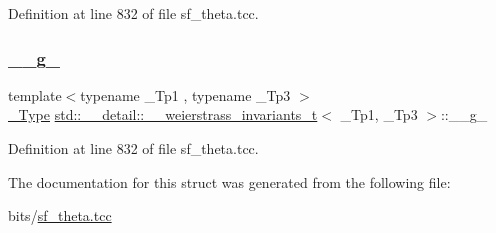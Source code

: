 Definition at line 832 of file sf\+\_\+theta.\+tcc.

\mbox{\label{structstd_1_1____detail_1_1____weierstrass__invariants__t_a585d9c21b0b189782b58f121cd101289}} 
\subsubsection{\texorpdfstring{\+\_\+\+\_\+g\+\_}{\_\_g\_3}}
{\footnotesize\ttfamily template$<$typename \+\_\+\+Tp1 , typename \+\_\+\+Tp3 $>$ \\
\hyperlink{structstd_1_1____detail_1_1____weierstrass__invariants__t_a9992ab3f07a514203487c0760d76173f}{\+\_\+\+Type} \hyperlink{structstd_1_1____detail_1_1____weierstrass__invariants__t}{std\+::\+\_\+\+\_\+detail\+::\+\_\+\+\_\+weierstrass\+\_\+invariants\+\_\+t}$<$ \+\_\+\+Tp1, \+\_\+\+Tp3 $>$\+::\+\_\+\+\_\+g\+\_}



Definition at line 832 of file sf\+\_\+theta.\+tcc.



The documentation for this struct was generated from the following file\+:\begin{DoxyCompactItemize}
\item 
bits/\hyperlink{sf__theta_8tcc}{sf\+\_\+theta.\+tcc}\end{DoxyCompactItemize}

